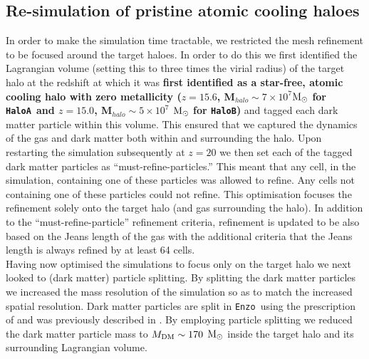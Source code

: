 \documentclass[twocolumn,iop,revtex4]{openjournal}
\newcommand{\enzo}{\texttt{Enzo~}}
\newcommand{\msolar} {$\rm{M_{\odot}}~$}
\newcommand{\ha} {\texttt{HaloA~}}
\newcommand{\hbc} {\texttt{HaloB}}
\begin{document}
 \subsection{Re-simulation of pristine atomic cooling haloes} \label{Sec:Resimulation}
In order to make the simulation time tractable, we restricted the mesh refinement to be focused
around the target haloes. In order to do this we first identified the Lagrangian
volume (setting this to three times the virial radius) of the target halo
at the redshift at which it was \textbf{first identified as a star-free, atomic cooling halo with zero metallicity ($z = 15.6$, M$_{halo} \sim 7 \times 10^7 $\msolar for \ha and $z = 15.0$,
M$_{halo} \sim 5 \times 10^7$ \msolar for \hbc)} and tagged each dark matter particle within this volume. This ensured
 that we  captured the dynamics of the gas and dark matter both within and surrounding the halo.
 Upon restarting
 the simulation subsequently at $z = 20$ we then set each of the tagged dark matter particles as
 ``must-refine-particles.'' This meant that any cell, in the simulation, containing one of these
 particles was allowed to refine. Any cells not containing one of these particles could not refine.
 This optimisation focuses the refinement solely onto the target halo (and gas surrounding the halo).
 In addition to the ``must-refine-particle'' refinement criteria,  refinement is updated to be
 also based on the Jeans length of the
 gas with the additional criteria that the Jeans length is always refined by at least 64 cells. \\ 
 \indent Having now optimised the simulations to focus only on the target halo 
 we next looked to (dark matter) particle splitting. By splitting the dark matter
 particles we increased the mass resolution of the simulation so as to match the increased spatial
 resolution. Dark matter particles are split in \enzo using the prescription of
 \cite{Kitsionas_2002} and was previously described in \cite{Regan_2015}. By employing particle
 splitting we reduced the dark matter particle mass to $M_{\rm DM} \sim 170$ \msolar inside the
 target halo and its surrounding Lagrangian volume.
\end{document}
